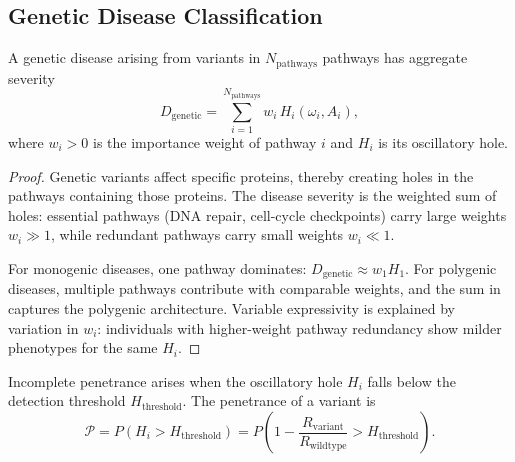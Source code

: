 \subsection{Genetic Disease Classification}
\label{sec:ch07-genetic-disease}

\begin{theorem}
\label{thm:ch07-genetic-disease}
A genetic disease arising from variants in $N_{\mathrm{pathways}}$ pathways
has aggregate severity
\begin{equation}
  D_{\mathrm{genetic}}
  = \sum_{i=1}^{N_{\mathrm{pathways}}} w_i\, H_i(\omega_i, A_i),
  \label{eq:ch07-genetic-disease}
\end{equation}
where $w_i > 0$ is the importance weight of pathway $i$ and $H_i$ is its
oscillatory hole.
\end{theorem}

\begin{proof}
Genetic variants affect specific proteins, thereby creating holes in the
pathways containing those proteins.  The disease severity is the weighted
sum of holes: essential pathways (DNA repair, cell-cycle checkpoints) carry
large weights $w_i \gg 1$, while redundant pathways carry small weights
$w_i \ll 1$.

For monogenic diseases, one pathway dominates:
$D_{\mathrm{genetic}} \approx w_1 H_1$.  For polygenic diseases, multiple
pathways contribute with comparable weights, and the sum in
 captures the polygenic architecture.
Variable expressivity is explained by variation in $w_i$: individuals with
higher-weight pathway redundancy show milder phenotypes for the same $H_i$.
\end{proof}

\begin{corollary}
\label{cor:ch07-penetrance}
Incomplete penetrance arises when the oscillatory hole $H_i$ falls below
the detection threshold $H_{\mathrm{threshold}}$.  The penetrance of a
variant is
\begin{equation}
  \mathcal{P}
  = P\!\left(H_i > H_{\mathrm{threshold}}\right)
  = P\!\left(1 - \frac{R_{\mathrm{variant}}}{R_{\mathrm{wildtype}}}
      > H_{\mathrm{threshold}}\right).
  \label{eq:ch07-penetrance}
\end{equation}
\end{corollary}

